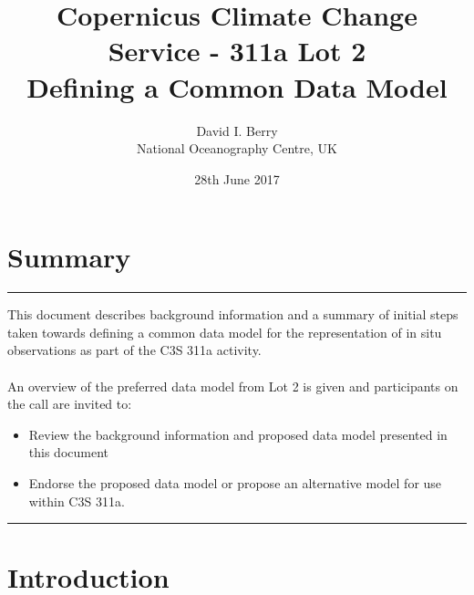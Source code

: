 \documentclass[a4paper]{article}
\title {Copernicus Climate Change Service - 311a Lot 2 \\ Defining a Common Data Model}
\author {David I. Berry \\ National Oceanography Centre, UK}
\date {28th June 2017}
\begin{document}
\maketitle

\vskip 0.25in
\section*{Summary}
\hrule
\vskip 0.25in
\noindent This document describes background information and a summary of initial steps taken towards defining a common data model for the representation of in situ observations as part of the C3S 311a activity.\\ \\
\noindent An overview of the preferred data model from Lot 2 is given and participants on the call are invited to:\\
\begin{itemize}
\item Review the background information and proposed data model presented in this document
\item Endorse the proposed data model or propose an alternative model for use within C3S 311a.
\end{itemize}
\vskip 0.25in
\hrule

\newpage
\tableofcontents
\newpage
\listoftables
\newpage


\section {Introduction}
\end{document}
